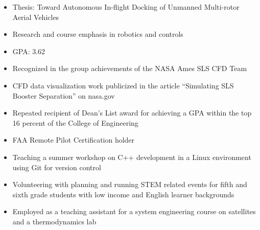 
\begin{itemize}
  \item Thesis: Toward Autonomous In-flight Docking of Unmanned Multi-rotor Aerial Vehicles
  \item Research and course emphasis in robotics and controls
  \item GPA: 3.62
\end{itemize}
\divider

\smallskip
{}

\par\medskip
{}
\par\medskip
{}

\begin{itemize}
    \item Recognized in the group achievements of the NASA Ames SLS CFD Team
    \item CFD data visualization work publicized in the article “Simulating SLS Booster Separation” on nasa.gov
    \item Repeated recipient of Dean’s List award for achieving a GPA within the top 16 percent of the College of Engineering
\end{itemize}

\begin{itemize}
    \item FAA Remote Pilot Certification holder
    \item Teaching a summer workshop on C++ development in a Linux environment using Git for version control
    \item Volunteering with planning and running STEM related events for fifth and sixth grade students with low income and English learner backgrounds 
    \item Employed as a teaching assistant for a system engineering course on satellites and a thermodynamics lab
\end{itemize}